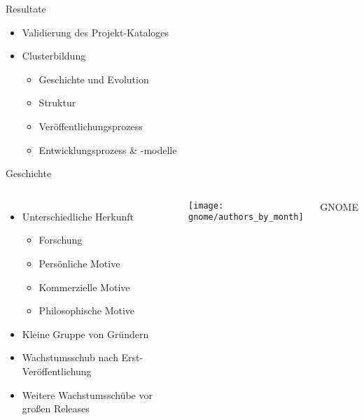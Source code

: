 \documentclass[11pt]{beamer}
\newlength{\colwidth}
\begin{document}
\begin{frame}[T]{Resultate}
  \begin{itemize}
    \item Validierung des Projekt-Kataloges
    \item Clusterbildung
    \begin{itemize}
      \item Geschichte und Evolution
      \item Struktur
      \item Veröffentlichungsprozess
      \item Entwicklungsprozess \& -modelle
    \end{itemize}
  \end{itemize}
\end{frame}

\begin{frame}{Geschichte}
  \begin{columns}
  \column{\colwidth}
  \begin{itemize}
    \item Unterschiedliche Herkunft
    \begin{itemize}
      \item Forschung
      \item Persönliche Motive
      \item Kommerzielle Motive
      \item Philosophische Motive
    \end{itemize}
    \item Kleine Gruppe von Gründern
    \item Wachstumsschub nach Erst-Veröffentlichung
    \item Weitere Wachstumsschübe vor großen Releases
  \end{itemize}
  \column{\colwidth}
    \texttt{[image: gnome/authors\_by\_month]}

    {\tiny\hfill
    GNOME
    }
  \end{columns}
\end{frame}
\end{document}
